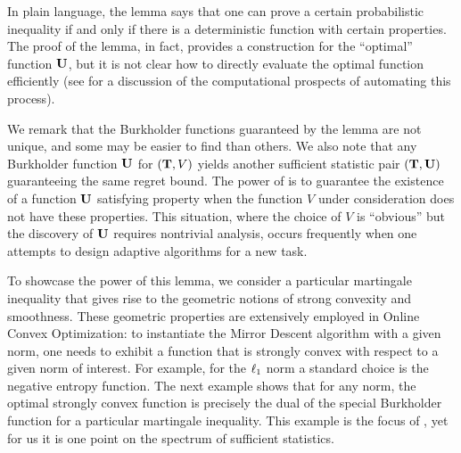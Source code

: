 In plain language, the lemma says that one can prove a certain probabilistic inequality if and only if there is a deterministic function with certain properties. The proof of the lemma, in fact, provides a construction for the ``optimal'' function $\mathbf{U}$, but it is not clear how to directly evaluate the optimal function efficiently (see  for a discussion of the computational prospects of automating this process).

We remark that the Burkholder functions guaranteed by the lemma are not unique, and some may be easier to find than others. We also note that any Burkholder function $\mathbf{U}$ for $(\mathbf{T},V)$ yields another sufficient statistic pair $(\mathbf{T}, \mathbf{U})$ guaranteeing the same regret bound. The power of  is to guarantee the existence of a function $\mathbf{U}$ satisfying property \propthree{} when the function $V$ under consideration does not have these properties. This situation, where the choice of $V$ is ``obvious'' but the discovery of $\mathbf{U}$ requires nontrivial analysis, occurs frequently when one attempts to design adaptive algorithms for a new task.

To showcase the power of this lemma, we consider a particular martingale inequality that gives rise to the geometric notions of strong convexity and smoothness. These geometric properties are extensively employed in Online Convex Optimization: to instantiate the Mirror Descent algorithm with a given norm, one needs to exhibit a function that is strongly convex with respect to a given norm of interest. For example, for the $\ell_{1}$ norm a standard choice is the negative entropy function. The next example shows that for any norm, the optimal strongly convex function is precisely the dual of the special Burkholder function for a particular martingale inequality. This example is the focus of \cite{Pisier75}, yet for us it is one point on the spectrum of sufficient statistics.

